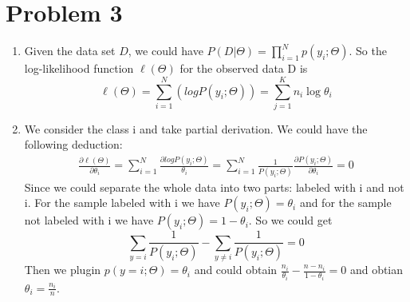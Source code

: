 \documentclass[paper=a4, fontsize=12pt]{scrartcl} %
\numberwithin{equation}{section} %
\numberwithin{figure}{section} %
\numberwithin{table}{section} %
\begin{document}
\section{Problem 3}
\begin{enumerate}
\item Given the data set $D$, we could have $P(D|\Theta) = \prod_{i = 1}^{N} p(y_{i};\Theta)$. So the log-likelihood function $\ell(\Theta)$ for the observed data D is 
\begin{equation}
\ell(\Theta) = \sum_{i = 1}^{N}(logP(y_{i}; \Theta)) = \sum_{j = 1}^{K} n_{i}\log \theta_{i}
\end{equation}
\item We consider the class i and take partial derivation. We could have the following deduction:
\begin{equation}
\begin{aligned}
\frac{\partial \ell(\Theta)}{\partial \theta_{i}} = \sum_{i=1}^{N}\frac{\partial logP(y_{i};\Theta)}{\theta_{i}} = \sum_{i=1}^{N}\frac{1}{P(y_{i};\Theta)}\frac{\partial P(y_{i};\Theta)}{\partial \theta_{i}} = 0
\end{aligned}
\end{equation}
Since we could separate the whole data into two parts: labeled with i and not i. For the sample labeled with i we have $P(y_{i};\Theta) = \theta_{i}$ and for the sample not labeled with i we have $P(y_{i};\Theta) = 1 - \theta_{i}$. So we could get 
\begin{equation}
\label{equ7}
\sum_{y = i}\frac{1}{P(y_{i}; \Theta)} - \sum_{y \neq i}\frac{1}{P(y_{i}; \Theta)} = 0
\end{equation}
Then we plugin $p(y = i; \Theta) = \theta_{i}$ and could obtain $\frac{n_{i}}{\theta_{i}} - \frac{n - n_{i}}{1 - \theta_{i}} = 0$ and obtian $\theta_{i} = \frac{n_{i}}{n}$.
\end{enumerate}
\end{document}
